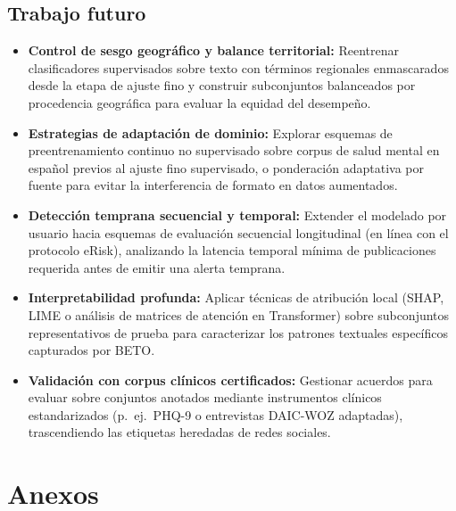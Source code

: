\documentclass[12pt,a4paper]{article}
\begin{document}
\subsection{Trabajo futuro}
\label{sec:trabajo_futuro}
\begin{itemize}[leftmargin=2em]
    \item \textbf{Control de sesgo geográfico y balance territorial:} Reentrenar clasificadores supervisados sobre texto con términos regionales enmascarados desde la etapa de ajuste fino y construir subconjuntos balanceados por procedencia geográfica para evaluar la equidad del desempeño.
    \item \textbf{Estrategias de adaptación de dominio:} Explorar esquemas de preentrenamiento continuo no supervisado sobre corpus de salud mental en español previos al ajuste fino supervisado, o ponderación adaptativa por fuente para evitar la interferencia de formato en datos aumentados.
    \item \textbf{Detección temprana secuencial y temporal:} Extender el modelado por usuario hacia esquemas de evaluación secuencial longitudinal (en línea con el protocolo eRisk), analizando la latencia temporal mínima de publicaciones requerida antes de emitir una alerta temprana.
    \item \textbf{Interpretabilidad profunda:} Aplicar técnicas de atribución local (SHAP, LIME o análisis de matrices de atención en Transformer) sobre subconjuntos representativos de prueba para caracterizar los patrones textuales específicos capturados por BETO.
    \item \textbf{Validación con corpus clínicos certificados:} Gestionar acuerdos para evaluar sobre conjuntos anotados mediante instrumentos clínicos estandarizados (p.~ej.\ PHQ-9 o entrevistas DAIC-WOZ adaptadas), trascendiendo las etiquetas heredadas de redes sociales.
\end{itemize}

\newpage
\renewcommand{\refname}{Referencias}



\newpage
\appendix
\section{Anexos}
\end{document}
